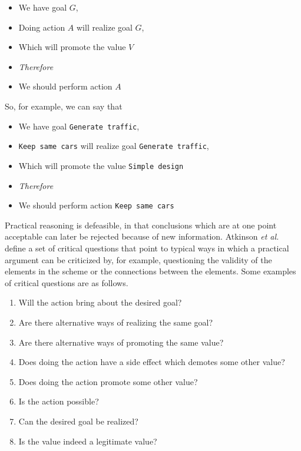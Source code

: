 \begin{itemize}
\item[] We have goal $G$,
\item[] Doing action $A$ will realize goal $G$,
\item[] Which will promote the value $V$
\item[] \textit{Therefore} 
\item[] We should perform action $A$
\end{itemize}

So, for example, we can say that 
\begin{itemize}
\item[] We have goal  \texttt{Generate traffic},
\item[]  \texttt{Keep same cars} will realize goal  \texttt{Generate traffic},
\item[] Which will promote the value  \texttt{Simple design}
\item[] \textit{Therefore} 
\item[] We should perform action  \texttt{Keep same cars}
\end{itemize}

Practical reasoning is defeasible, in that conclusions which are at one point acceptable can later be rejected because of new information. Atkinson \emph{et al.}~\cite{atkinson2007} define a set of critical questions that point to typical ways in which a practical argument can be criticized by, for example, questioning the validity of the elements in the scheme or the connections between the elements. Some examples of critical questions are as follows.

\begin{enumerate}
\item Will the action bring about the desired goal?
\item Are there alternative ways of realizing the same goal?
\item Are there alternative ways of promoting the same value?
\item Does doing the action have a side effect which demotes some other value?
\item Does doing the action promote some other value?
\item Is the action possible?
\item Can the desired goal be realized?
\item Is the value indeed a legitimate value?
\end{enumerate}

